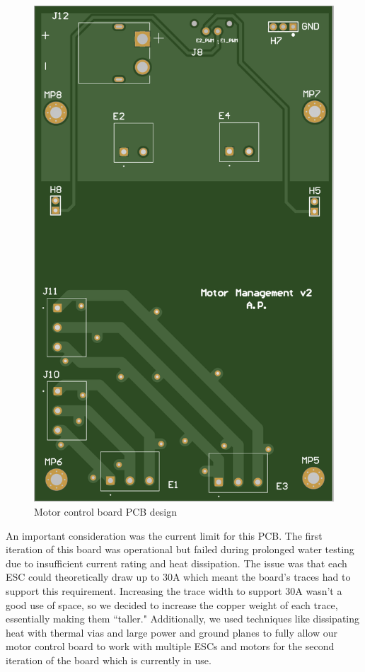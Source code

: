 \documentclass[conference]{IEEEtran}
\begin{document}
\begin{figure}[htbp]
    \centerline{\includegraphics[scale=0.3]{images/motor_pcb.png}}
    \caption{Motor control board PCB design}
    \label{fig:motor_pcb}
\end{figure}

An important consideration was the current limit for this PCB. The first iteration of this board was operational but failed during prolonged water testing due to insufficient current rating and heat dissipation. The issue was that each ESC could theoretically draw up to 30A which meant the board’s traces had to support this requirement. Increasing the trace width to support 30A wasn’t a good use of space, so we decided to increase the copper weight of each trace, essentially making them ``taller." Additionally, we used techniques like dissipating heat with thermal vias and large power and ground planes to fully allow our motor control board to work with multiple ESCs and motors for the second iteration of the board which is currently in use.
\end{document}
